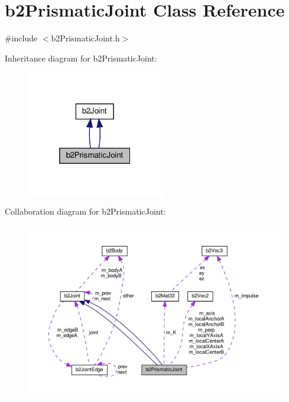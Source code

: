 \hypertarget{classb2PrismaticJoint}{}\section{b2\+Prismatic\+Joint Class Reference}
\label{classb2PrismaticJoint}


{\ttfamily \#include $<$b2\+Prismatic\+Joint.\+h$>$}



Inheritance diagram for b2\+Prismatic\+Joint\+:
\nopagebreak
\begin{figure}[H]
\begin{center}
\leavevmode
\includegraphics[width=169pt]{classb2PrismaticJoint__inherit__graph}
\end{center}
\end{figure}


Collaboration diagram for b2\+Prismatic\+Joint\+:
\nopagebreak
\begin{figure}[H]
\begin{center}
\leavevmode
\includegraphics[width=350pt]{classb2PrismaticJoint__coll__graph}
\end{center}
\end{figure}
